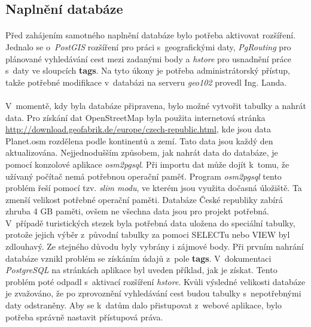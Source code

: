 \documentclass[11pt,a4paper,titlepage,oneside]{book}
\begin{document}

			\subsection{Naplnění databáze}
				\paragraph{} Před zahájením samotného naplnění databáze bylo potřeba aktivovat rozšíření. Jednalo se o~\textit{PostGIS} rozšíření pro práci s~geografickými daty, \textit{PgRouting} pro plánované vyhledávání cest mezi zadanými body a \textit{hstore} pro usnadnění práce s~daty ve sloupcích \textbf{tags}. Na tyto úkony je potřeba administrátorský přístup, takže potřebné modifikace v~databázi na serveru \textit{geo102} provedl Ing. Landa.
				\paragraph{} V~momentě, kdy byla databáze připravena, bylo možné vytvořit tabulky a nahrát data. Pro získání dat OpenStreetMap byla použita internetová stránka \url{http://download.geofabrik.de/europe/czech-republic.html}, kde jsou data Planet.osm rozdělena podle kontinentů a zemí. Tato data jsou každý den aktualizována. Nejjednodušším způsobem, jak nahrát data do databáze, je pomocí konzolové aplikace \textit{osm2pgsql}. Při importu dat může dojít k~tomu, že užívaný počítač nemá potřebnou operační paměť. Program \textit{osm2pgsql} tento problém řeší pomocí tzv. \textit{slim modu}, ve kterém jsou využita dočasná úložiště. Ta zmenší velikost potřebné operační paměti. Databáze České republiky zabírá zhruba 4 GB paměti, ovšem ne všechna data jsou pro projekt potřebná. V~případě turistických stezek byla potřebná data uložena do speciální tabulky, protože jejich výběr z~původní tabulky za pomoci SELECTu nebo VIEW byl zdlouhavý. Ze stejného důvodu byly vybrány i zájmové body. Při prvním nahrání databáze vznikl problém se získáním údajů z~pole \textbf{tags}. V~dokumentaci \textit{PostgreSQL} na stránkách aplikace byl uveden příklad, jak je získat. Tento problém poté odpadl s~aktivací rozšíření \textit{hstore}. Kvůli výsledné velikosti databáze je zvažováno, že po zprovoznění vyhledávání cest budou tabulky s~nepotřebnými daty odstraněny. Aby se k~datům dalo přistupovat z~webové aplikace, bylo potřeba správně nastavit přístupová práva.
\end{document}
